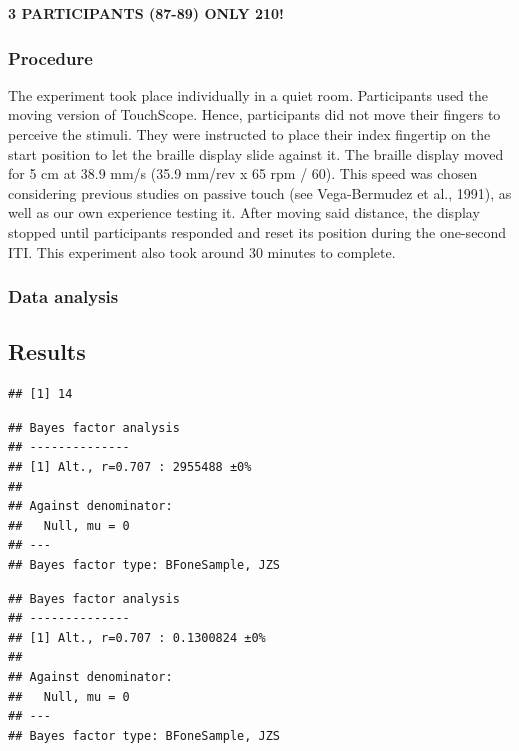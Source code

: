 \documentclass[
  english,
  man]{apa7}
\begin{document}
\textbf{3 PARTICIPANTS (87-89) ONLY 210!}

\hypertarget{procedure}{%
\subsubsection{Procedure}\label{procedure}}

The experiment took place individually in a quiet room. Participants used the moving version of TouchScope. Hence, participants did not move their fingers to perceive the stimuli. They were instructed to place their index fingertip on the start position to let the braille display slide against it. The braille display moved for 5 cm at 38.9 mm/s (35.9 mm/rev x 65 rpm / 60). This speed was chosen considering previous studies on passive touch (see Vega-Bermudez et al., 1991), as well as our own experience testing it. After moving said distance, the display stopped until participants responded and reset its position during the one-second ITI. This experiment also took around 30 minutes to complete.

\hypertarget{data-analysis}{%
\subsubsection{Data analysis}\label{data-analysis}}

\hypertarget{results}{%
\subsection{Results}\label{results}}

\begin{verbatim}
## [1] 14
\end{verbatim}

\begin{verbatim}
## Bayes factor analysis
## --------------
## [1] Alt., r=0.707 : 2955488 ±0%
## 
## Against denominator:
##   Null, mu = 0 
## ---
## Bayes factor type: BFoneSample, JZS
\end{verbatim}

\begin{verbatim}
## Bayes factor analysis
## --------------
## [1] Alt., r=0.707 : 0.1300824 ±0%
## 
## Against denominator:
##   Null, mu = 0 
## ---
## Bayes factor type: BFoneSample, JZS
\end{verbatim}
\end{document}
